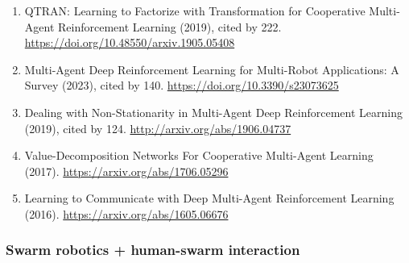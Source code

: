 \documentclass[11pt]{article}
\begin{document}
\begin{enumerate}
\item
  QTRAN: Learning to Factorize with Transformation for Cooperative
  Multi-Agent Reinforcement Learning (2019), cited by 222.
  \url{https://doi.org/10.48550/arxiv.1905.05408}
\item
  Multi-Agent Deep Reinforcement Learning for Multi-Robot Applications:
  A Survey (2023), cited by 140. \url{https://doi.org/10.3390/s23073625}
\item
  Dealing with Non-Stationarity in Multi-Agent Deep Reinforcement
  Learning (2019), cited by 124. \url{http://arxiv.org/abs/1906.04737}
\item
  Value-Decomposition Networks For Cooperative Multi-Agent Learning
  (2017). \url{https://arxiv.org/abs/1706.05296}
\item
  Learning to Communicate with Deep Multi-Agent Reinforcement Learning
  (2016). \url{https://arxiv.org/abs/1605.06676}
\end{enumerate}

\hypertarget{swarm-robotics-human-swarm-interaction}{%
\subsubsection{Swarm robotics + human-swarm
interaction}\label{swarm-robotics-human-swarm-interaction}}
\end{document}
